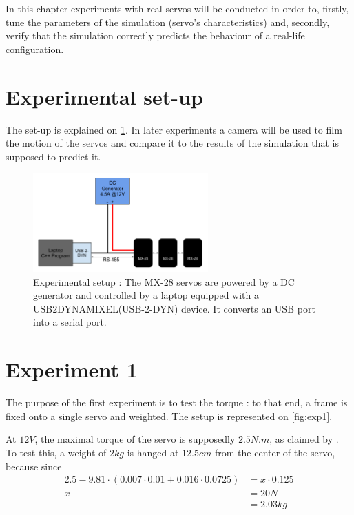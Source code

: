 In this chapter experiments with real servos will be conducted in order to, firstly, tune the parameters of the simulation (servo's characteristics) and, secondly, verify that the simulation correctly predicts the behaviour of a real-life configuration.

\section{Experimental set-up}
The set-up is explained on \cref{fig:exp_setup}. In later experiments a camera will be used to film the motion of the servos and compare it to the results of the simulation that is supposed to predict it.

\begin{figure}[htp]
\center
\includegraphics[width=0.6\textwidth]{figures/exp_setup}
\caption[Experimental setup]{Experimental setup : The MX-28 servos are powered by a DC generator and controlled by a laptop equipped with a USB2DYNAMIXEL(USB-2-DYN) device. It converts an USB port into a serial port.}
\label{fig:exp_setup}
\end{figure}

\section{Experiment 1}
The purpose of the first experiment is to test the torque : to that end, a frame is fixed onto a single servo and weighted. The setup is represented on \cref{fig:exp1}.

At $12V$, the maximal torque of the servo is supposedly $2.5N.m$, as claimed by \cite{mx_28_manual}. To test this, a weight of $2kg$ is hanged at $12.5cm$ from the center of the servo, because since 
\begin{align*}
2.5 - 9.81 \cdot (0.007 \cdot 0.01 + 0.016 \cdot 0.0725) &= x \cdot 0.125\\
x &= 20 N\\
&= 2.03 kg
\end{align*}

